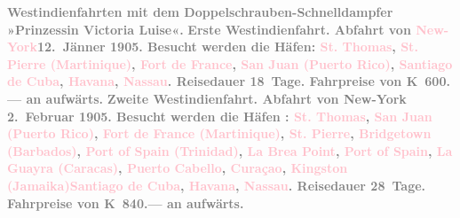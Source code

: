            {\bigskip}\pstart
           \noindent{}\centering{}\textcolor{gray}{\textbf{Westindienfahrten mit dem Doppelschrauben-Schnelldampfer
                  »Prinzessin Victoria Luise«.}}\pend
           \pstart
           \noindent{}\textcolor{gray}{\textbf{\textbf{Erste Westindienfahrt.} Abfahrt von \textcolor{pink}{New-York}{}\ledrightnote{\textcolor{pink}{New York City}}{ }\textbf{12. Jänner 1905}. Besucht werden die Häfen: \textcolor{pink}{St. Thomas}{}\ledrightnote{\textcolor{pink}{Saint Thomas}},
                     \textcolor{pink}{St. Pierre (Martinique)}{}\ledrightnote{\textcolor{pink}{Saint-Pierre}}, \textcolor{pink}{Fort de France}{}\ledrightnote{\textcolor{pink}{Fort-de-France}}, \textcolor{pink}{San Juan
                     (Puerto Rico)}{}\ledrightnote{\textcolor{pink}{San Juan}}, \textcolor{pink}{Santiago de Cuba}{}\ledrightnote{\textcolor{pink}{Santiago de Cuba}}, \textcolor{pink}{Havana}{}\ledrightnote{\textcolor{pink}{Havana}}, \textcolor{pink}{Nassau}{}\ledrightnote{\textcolor{pink}{Nassau}}. Reisedauer 18 Tage. Fahrpreise von \textbf{K 600.—}
                  an aufwärts.}}\pend
           \pstart
           \textcolor{gray}{\textbf{\textbf{Zweite Westindienfahrt.} Abfahrt von New-York { }\textbf{2. Februar 1905}. Besucht werden die Häfen : \textcolor{pink}{St. Thomas}{}\ledrightnote{\textcolor{pink}{Saint Thomas}},
                     \textcolor{pink}{San Juan (Puerto Rico)}{}\ledrightnote{\textcolor{pink}{San Juan}}, \textcolor{pink}{Fort de France (Martinique)}{}\ledrightnote{\textcolor{pink}{Fort-de-France}}, \textcolor{pink}{St. Pierre}{}\ledrightnote{\textcolor{pink}{Saint-Pierre}}, \textcolor{pink}{Bridgetown (Barbados)}{}\ledrightnote{\textcolor{pink}{Bridgetown}}, \textcolor{pink}{Port of Spain (Trinidad)}{}\ledrightnote{\textcolor{pink}{Port of Spain}}, \textcolor{pink}{La Brea Point}{}\ledrightnote{\textcolor{pink}{Punta Brea}}, \textcolor{pink}{Port of
                     Spain}{}\ledrightnote{\textcolor{pink}{Port of Spain}}, \textcolor{pink}{La Guayra (Caracas)}{}\ledrightnote{\textcolor{pink}{La Guaira}}, \textcolor{pink}{Puerto Cabello}{}\ledrightnote{\textcolor{pink}{Puerto Cabello}}, \textcolor{pink}{Curaçao}{}\ledrightnote{\textcolor{pink}{Curaçao}}, \textcolor{pink}{Kingston (Jamaika)}{}\ledrightnote{\textcolor{pink}{Kingston}}\textcolor{pink}{Santiago de Cuba}{}\ledrightnote{\textcolor{pink}{Santiago de Cuba}}, \textcolor{pink}{Havana}{}\ledrightnote{\textcolor{pink}{Havana}}, \textcolor{pink}{Nassau}{}\ledrightnote{\textcolor{pink}{Nassau}}. Reisedauer 28 Tage.
                  Fahrpreise von \textbf{K 840.—} an aufwärts.}}\pend
